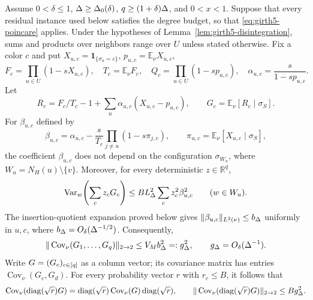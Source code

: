 \begin{lemma}
\label{lem:girth5-color-covariance}
Assume $0<\delta\le1$, $\Delta\ge\Delta_0(\delta)$,
$q\ge(1+\delta)\Delta$, and $0<x<1$.  Suppose that every residual instance
used below satisfies the degree budget, so that \eqref{eq:girth5-poincare}
applies.  Under the hypotheses of
Lemma~\ref{lem:girth5-disintegration}, sums and products over neighbors
range over $U$ unless stated otherwise.  Fix a color $c$ and put
$X_{u,c}=\mathbf1_{\{\sigma_u=c\}}$,
$p_{u,c}=\mathbb E_\nu X_{u,c}$,
\[
 F_c=\prod_{u\in U}(1-sX_{u,c}),\quad T_c=\mathbb E_\nu F_c,\quad
 Q_c=\prod_{u\in U}(1-sp_{u,c}),\quad
 \alpha_{u,c}=\frac{s}{1-sp_{u,c}}.
\]
Let
\[
 R_c=F_c/T_c-1+\sum_u\alpha_{u,c}(X_{u,c}-p_{u,c}),
 \qquad G_c=\mathbb E_\nu[R_c\mid\sigma_S].
\]
For $\beta_{u,c}$ defined by
\[
 \beta_{u,c}=\alpha_{u,c}-\frac{s}{T_c}
 \prod_{j\ne u}(1-s\pi_{j,c}),
 \qquad
 \pi_{u,c}=\mathbb E_\nu[X_{u,c}\mid\sigma_S],
\]
the coefficient $\beta_{u,c}$ does not depend on the configuration
$\sigma_{W_u}$, where $W_u=N_H(u)\setminus\{v\}$.  Moreover, for every deterministic
$z\in\mathbb R^q$,
\begin{equation}\label{eq:girth5-coordinate-variance}
 \operatorname{Var}_w\!\left(\sum_cz_cG_c\right)
 \le BL_\Delta^2\sum_cz_c^2\beta_{u,c}^2\qquad(w\in W_u).
\end{equation}
The insertion-quotient expansion proved below gives
$\|\beta_{u,c}\|_{L^2(\nu)}\le b_\Delta$ uniformly in $u,c$, where
$b_\Delta=O_\delta(\Delta^{-1/2})$.  Consequently,
\begin{equation}\label{eq:girth5-colour-covariance}
 \|\operatorname{Cov}_\nu(G_1,\ldots,G_q)\|_{2\to2}
 \le V_M b_\Delta^2=:g_\Delta^2,
 \qquad g_\Delta=O_\delta(\Delta^{-1}).
\end{equation}
Write $G=(G_c)_{c\in[q]}$ as a column vector; its covariance matrix
has entries $\operatorname{Cov}_\nu(G_c,G_d)$.  For every probability
vector $r$ with $r_c\le B$, it follows that
\begin{equation}\label{eq:girth5-weighted-covariance}
 \operatorname{Cov}_\nu(\operatorname{diag}(\sqrt r)G)
 =\operatorname{diag}(\sqrt r)\operatorname{Cov}_\nu(G)\operatorname{diag}(\sqrt r),
 \qquad
 \|\operatorname{Cov}_\nu(\operatorname{diag}(\sqrt r)G)\|_{2\to2}
 \le Bg_\Delta^2.
\end{equation}
\end{lemma}

